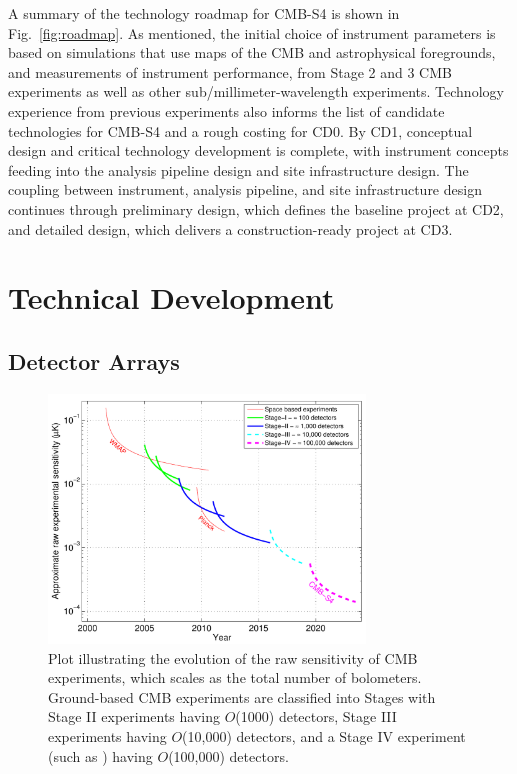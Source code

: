 A summary of the technology roadmap for CMB-S4 is shown in Fig.~\ref{fig:roadmap}.  As mentioned, the initial choice of instrument parameters is based on simulations that use maps of the CMB and astrophysical foregrounds, and measurements of instrument performance, from Stage 2 and 3 CMB experiments as well as other sub/millimeter-wavelength experiments. Technology experience from previous experiments also informs the list of candidate technologies for CMB-S4 and a rough costing for CD0. By CD1, conceptual design and critical technology development is complete, with instrument concepts feeding into the analysis pipeline design and site infrastructure design. The coupling between instrument, analysis pipeline, and site infrastructure design continues through preliminary design, which defines the baseline project at CD2, and detailed design, which delivers a construction-ready project at CD3.

\section{Technical Development}

\subsection{Detector Arrays}

\begin{figure}[t]
\centering \includegraphics[width=0.75\textwidth]{Intro/expt_progress.pdf}
\caption{Plot illustrating the evolution of the raw sensitivity of CMB
  experiments, which scales as the total number of
  bolometers. Ground-based CMB experiments are classified into Stages
  with Stage II experiments having $O$(1000) detectors, Stage III
  experiments having $O$(10,000) detectors, and a Stage IV experiment
  (such as \cmbexp) having $O$(100,000) detectors.}
\label{fig:expt_progress}
\end{figure}

